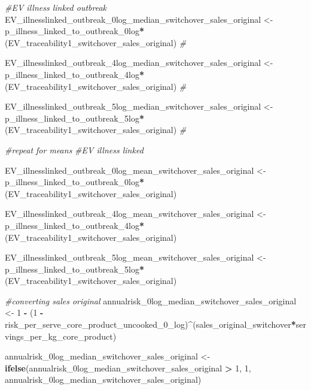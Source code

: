 \documentclass[
]{article}
\newenvironment{Shaded}{\begin{snugshade}}{\end{snugshade}}
\newcommand{\CommentTok}[1]{\textcolor[rgb]{0.56,0.35,0.01}{\textit{#1}}}
\newcommand{\DecValTok}[1]{\textcolor[rgb]{0.00,0.00,0.81}{#1}}
\newcommand{\FunctionTok}[1]{\textcolor[rgb]{0.13,0.29,0.53}{\textbf{#1}}}
\newcommand{\NormalTok}[1]{#1}
\newcommand{\OtherTok}[1]{\textcolor[rgb]{0.56,0.35,0.01}{#1}}
\newcommand{\SpecialCharTok}[1]{\textcolor[rgb]{0.81,0.36,0.00}{\textbf{#1}}}
\begin{document}
\begin{Shaded}
\begin{Highlighting}[]
\CommentTok{\#EV illness linked outbreak}
\NormalTok{EV\_illnesslinked\_outbreak\_0log\_median\_switchover\_sales\_original }\OtherTok{\textless{}{-}}\NormalTok{ p\_illness\_linked\_to\_outbreak\_0log}\SpecialCharTok{*}\NormalTok{(EV\_traceability1\_switchover\_sales\_original) }\CommentTok{\#}

\NormalTok{EV\_illnesslinked\_outbreak\_4log\_median\_switchover\_sales\_original }\OtherTok{\textless{}{-}}\NormalTok{ p\_illness\_linked\_to\_outbreak\_4log}\SpecialCharTok{*}\NormalTok{(EV\_traceability1\_switchover\_sales\_original) }\CommentTok{\#}

\NormalTok{EV\_illnesslinked\_outbreak\_5log\_median\_switchover\_sales\_original }\OtherTok{\textless{}{-}}\NormalTok{ p\_illness\_linked\_to\_outbreak\_5log}\SpecialCharTok{*}\NormalTok{(EV\_traceability1\_switchover\_sales\_original) }\CommentTok{\#}


\CommentTok{\#repeat for means}
\CommentTok{\#EV illness linked}

\NormalTok{EV\_illnesslinked\_outbreak\_0log\_mean\_switchover\_sales\_original }\OtherTok{\textless{}{-}}\NormalTok{ p\_illness\_linked\_to\_outbreak\_0log}\SpecialCharTok{*}\NormalTok{(EV\_traceability1\_switchover\_sales\_original) }

\NormalTok{EV\_illnesslinked\_outbreak\_4log\_mean\_switchover\_sales\_original }\OtherTok{\textless{}{-}}\NormalTok{ p\_illness\_linked\_to\_outbreak\_4log}\SpecialCharTok{*}\NormalTok{(EV\_traceability1\_switchover\_sales\_original) }

\NormalTok{EV\_illnesslinked\_outbreak\_5log\_mean\_switchover\_sales\_original }\OtherTok{\textless{}{-}}\NormalTok{ p\_illness\_linked\_to\_outbreak\_5log}\SpecialCharTok{*}\NormalTok{(EV\_traceability1\_switchover\_sales\_original) }

\CommentTok{\#converting sales original}
\NormalTok{annualrisk\_0log\_median\_switchover\_sales\_original }\OtherTok{\textless{}{-}} \DecValTok{1} \SpecialCharTok{{-}}\NormalTok{ (}\DecValTok{1} \SpecialCharTok{{-}}\NormalTok{ risk\_per\_serve\_core\_product\_uncooked\_0\_log)}\SpecialCharTok{\^{}}\NormalTok{(sales\_original\_switchover}\SpecialCharTok{*}\NormalTok{servings\_per\_kg\_core\_product)}

\NormalTok{annualrisk\_0log\_median\_switchover\_sales\_original }\OtherTok{\textless{}{-}} \FunctionTok{ifelse}\NormalTok{(annualrisk\_0log\_median\_switchover\_sales\_original }\SpecialCharTok{\textgreater{}} \DecValTok{1}\NormalTok{, }\DecValTok{1}\NormalTok{, annualrisk\_0log\_median\_switchover\_sales\_original)}


\end{Highlighting}
\end{Shaded}
\end{document}
